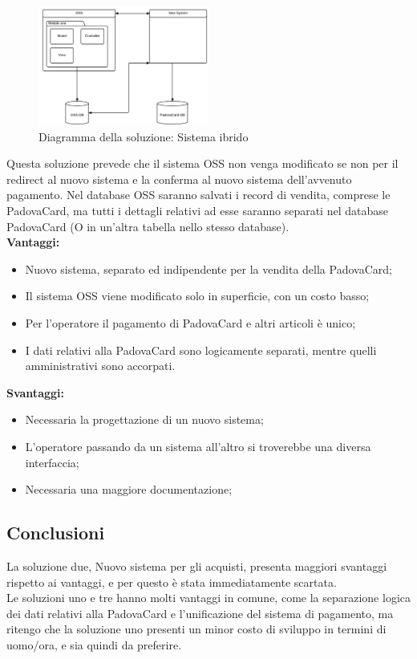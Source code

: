 \begin{figure}[H]
\centering
\includegraphics[width=0.5\textwidth]{images/Sistema_ibrido.png}
\caption{Diagramma della soluzione: Sistema ibrido}
\end{figure}
Questa soluzione prevede che il sistema OSS non venga modificato se non per il redirect al nuovo sistema e la conferma al nuovo sistema dell'avvenuto pagamento. 
Nel database OSS saranno salvati i record di vendita, comprese le PadovaCard, ma tutti i dettagli relativi ad esse saranno separati nel database PadovaCard (O in un'altra tabella nello stesso database). \\
\textbf{Vantaggi:}
\begin{itemize}
\item Nuovo sistema, separato ed indipendente per la vendita della PadovaCard;
\item Il sistema OSS viene modificato solo in superficie, con un costo basso;
\item Per l'operatore il pagamento di PadovaCard e altri articoli è unico;
\item I dati relativi alla PadovaCard sono logicamente separati, mentre quelli amministrativi sono accorpati.
\end{itemize}
\textbf{Svantaggi:}
\begin{itemize}
\item Necessaria la progettazione di un nuovo sistema;
\item L'operatore passando da un sistema all'altro si troverebbe una diversa interfaccia;
\item Necessaria una maggiore documentazione;
\end{itemize}

\subsection{Conclusioni}
La soluzione due, Nuovo sistema per gli acquisti, presenta maggiori svantaggi rispetto ai vantaggi, e per questo è stata immediatamente scartata. \\

Le soluzioni uno e tre hanno molti vantaggi in comune, come la separazione logica dei dati relativi alla PadovaCard e l'unificazione del sistema di pagamento, ma ritengo che la soluzione uno presenti un minor costo di sviluppo in termini di uomo/ora, e sia quindi da preferire.